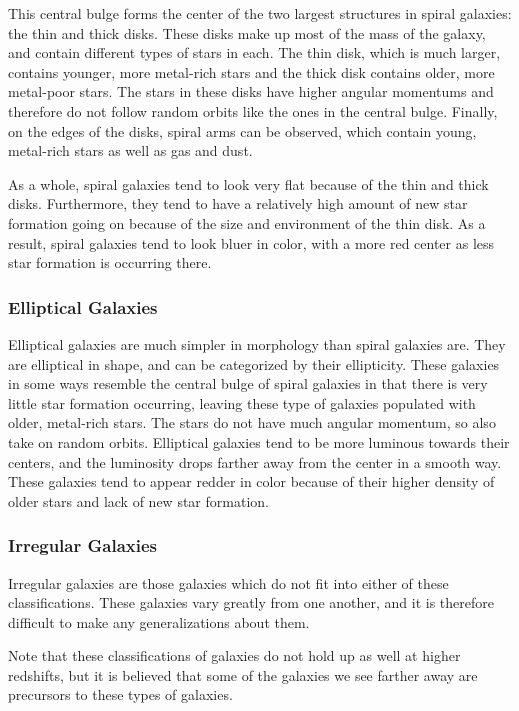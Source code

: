 \documentclass[12pt]{article}
\begin{document}
    This central bulge forms the center of the two largest structures in spiral
    galaxies: the thin and thick disks.  These disks make up most of the mass of
    the galaxy, and contain different types of stars in each.  The thin disk,
    which is much larger, contains younger, more metal-rich stars and the thick
    disk contains older, more metal-poor stars.  The stars in these disks have
    higher angular momentums and therefore do not follow random orbits like the
    ones in the central bulge.  Finally, on the edges of the disks, spiral arms
    can be observed, which contain young, metal-rich stars as well as gas and
    dust.

    As a whole, spiral galaxies tend to look very flat because of the thin and
    thick disks.  Furthermore, they tend to have a relatively high amount of new
    star formation going on because of the size and environment of the thin
    disk.  As a result, spiral galaxies tend to look bluer in color, with a more
    red center as less star formation is occurring there.

    \subsubsection*{Elliptical Galaxies}
    Elliptical galaxies are much simpler in morphology than spiral galaxies are.
    They are elliptical in shape, and can be categorized by their ellipticity.
    These galaxies in some ways resemble the central bulge of spiral galaxies in
    that there is very little star formation occurring, leaving these type of
    galaxies populated with older, metal-rich stars.  The stars do not have much
    angular momentum, so also take on random orbits.  Elliptical galaxies tend
    to be more luminous towards their centers, and the luminosity drops farther
    away from the center in a smooth way.  These galaxies tend to appear redder
    in color because of their higher density of older stars and lack of new star
    formation.

    \subsubsection*{Irregular Galaxies}
    Irregular galaxies are those galaxies which do not fit into either of these
    classifications.  These galaxies vary greatly from one another, and it is
    therefore difficult to make any generalizations about them.

    Note that these classifications of galaxies do not hold up as well at higher
    redshifts, but it is believed that some of the galaxies we see farther away
    are precursors to these types of galaxies.
\end{document}
